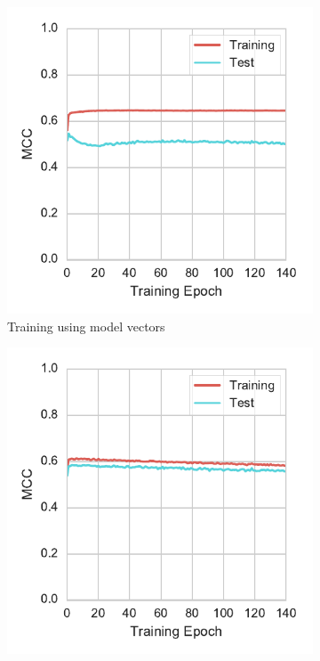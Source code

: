 \begin{figure}[h]
    \centering
    \begin{subfigure}[b]{0.49\textwidth}
      \includegraphics[width=\textwidth]{img/exp-vector-space/doc2vec_training_trained}
      \caption{Training using model vectors}
\label{fig:doc2vec_training_trained}
    \end{subfigure}
    \begin{subfigure}[b]{0.49\textwidth}
      \includegraphics[width=\textwidth]{img/exp-vector-space/doc2vec_training_inferred}

\end{subfigure}
\end{figure}
